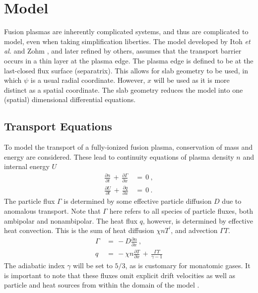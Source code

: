 \chapter{Model}\label{chapter:model}
Fusion plasmas are inherently complicated systems, and thus are complicated to model, even when taking simplification liberties.
The model developed by Itoh \emph{et al.} \cite{itoh_edge_1991} and Zohm \cite{zohm_dynamic_1994}, and later refined by others, assumes that the transport barrier occurs in a thin layer at the plasma edge.
The plasma edge is defined to be at the last-closed flux surface (separatrix).
This allows for slab geometry to be used, in which $\psi$ is a usual radial coordinate.
However, $x$ will be used as it is more distinct as a spatial coordinate.
The slab geometry reduces the model into one (spatial) dimensional differential equations.

\section{Transport Equations}\label{sec:transport_eqs}
To model the transport of a fully-ionized fusion plasma, conservation of mass and energy are considered.
These lead to continuity equations of plasma density $n$ and internal energy $U$
\begin{align} %
	\frac{\partial n}{\partial t} \,+\, \frac{\partial \Gamma}{\partial x} \,&=\, 0~,\label{eq:n_continuity} \\
	\frac{\partial U}{\partial t} \,+\, \frac{\partial q}{\partial x} \,&=\, 0\label{eq:U_continuity}~.
\end{align}
The particle flux $\Gamma$ is determined by some effective particle diffusion $D$ due to anomalous transport.
Note that $\Gamma$ here refers to all species of particle fluxes, both ambipolar and nonambipolar.
The heat flux $q$, however, is determined by effective heat convection.
This is the sum of heat diffusion $\chi n T^\prime$, and advection $\Gamma T$.
\begin{align} %
	\Gamma \,&=\, -D \frac{\partial n}{\partial x}~,\label{eq:particle_flux} \\
	q \,&=\, -\chi n \frac{\partial T}{\partial x} \,+\, \frac{\Gamma T}{\gamma - 1} \label{eq:heat_flux}
\end{align}
The adiabatic index $\gamma$ will be set to $5/3$, as is customary for monatomic gases.
It is important to note that these fluxes omit explicit drift velocities as well as particle and heat sources from within the domain of the model \cite{zohm_dynamic_1994}.

